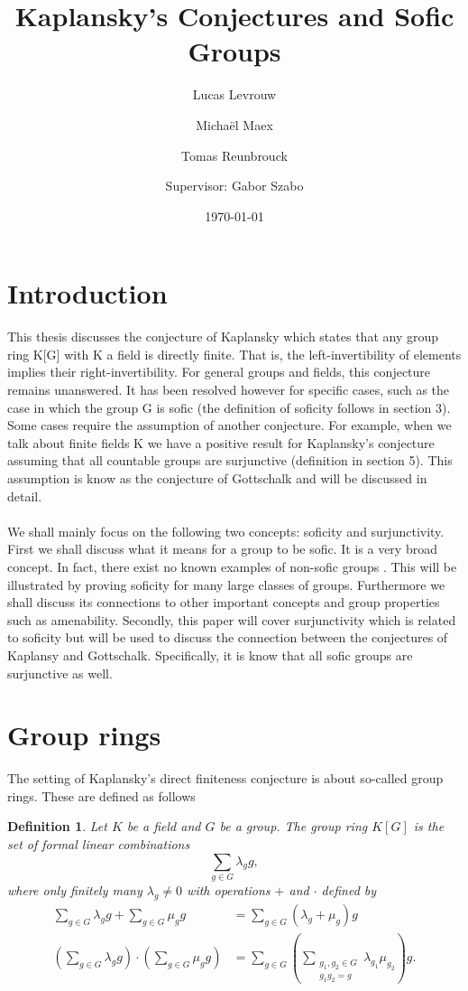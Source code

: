 \documentclass[titlepage, a4paper]{article}
\author{Lucas Levrouw \and Michaël Maex \and Tomas Reunbrouck \and Supervisor: Gabor Szabo}
\title{Kaplansky's Conjectures and Sofic Groups}
\date{\today}
\newtheorem{definition}{Definition}
\theoremstyle{remark}
\begin{document}
    \maketitle
{}
\tableofcontents
\pagebreak

\section{Introduction}\label{sec:intro}
This thesis discusses the conjecture of Kaplansky which states that any group ring K[G] with K a field is directly finite. That is, the left-invertibility of elements implies their right-invertibility. For general groups and fields, this conjecture remains unanswered. It has been resolved however for specific cases, such as the case in which the group G is sofic (the definition of soficity follows in section 3). Some cases require the assumption of another conjecture. For example, when we talk about finite fields K we have a positive result for Kaplansky’s conjecture assuming that all countable groups are surjunctive (definition in section 5). This assumption is know as the conjecture of Gottschalk and will be discussed in detail.\\
\\
We shall mainly focus on the following two concepts: soficity and surjunctivity. First we shall discuss what it means for a group to be sofic. It is a very broad concept. In fact, there exist no known examples of non-sofic groups \cite{weiss_2000}. This will be illustrated by proving soficity for many large classes of groups. Furthermore we shall discuss its connections to other important concepts and group properties such as amenability. Secondly, this paper will cover surjunctivity which is related to soficity but will be used to discuss the connection between the conjectures of Kaplansy and Gottschalk. Specifically, it is know that all sofic groups are surjunctive as well.

\section{Group rings}\label{sec:group_rings}

The setting of Kaplansky's direct finiteness conjecture is about so-called group rings. These are defined as follows


\begin{definition}\label{def:group_ring}
    Let $K$ be a field and $G$ be a group. The group ring $K[G]$ is the set of formal linear combinations
    \[
        \sum_{g \in G} \lambda_g g,
    \]
    where only finitely many $\lambda_g \neq 0$ with operations $+$ and $\cdot$ defined by
    \begin{align*}
        \sum_{g \in G} \lambda_g g + \sum_{g \in G} \mu_g g
        &= \sum_{g \in G} (\lambda_g+\mu_g) g \\
        \left(\sum_{g \in G} \lambda_g g \right) \cdot \left(\sum_{g \in G} \mu_g g \right)
        &= \sum_{g \in G} \left( \sum_{\substack{g_1, g_2 \in G \\ g_1 g_2 = g}} \lambda_{g_1} \mu_{g_2} \right) g.
    \end{align*}
\end{definition}
\end{document}
